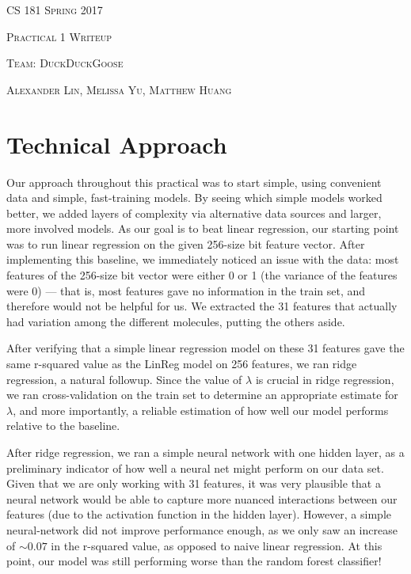 \documentclass[12pt]{article}
\begin{document}
\begin{center}
\textsc{CS 181 Spring 2017}

\textsc{Practical 1 Writeup}

\textsc{Team: DuckDuckGoose}

\textsc{Alexander Lin, Melissa Yu, Matthew Huang}
\end{center}

\section{Technical Approach}

Our approach throughout this practical was to start simple, using convenient data and simple, fast-training models. By seeing which simple models worked better, we added layers of complexity via alternative data sources and larger, more involved models. As our goal is to beat linear regression, our starting point was to run linear regression on the given 256-size bit feature vector. After implementing this baseline, we immediately noticed an issue with the data: most features of the 256-size bit vector were either 0 or 1 (the variance of the features were 0) --- that is, most features gave no information in the train set, and therefore would not be helpful for us. We extracted the 31 features that actually had variation among the different molecules, putting the others aside. 

After verifying that a simple linear regression model on these 31 features gave the same r-squared value as the LinReg model on 256 features, we ran ridge regression, a natural followup. Since the value of $\lambda$ is crucial in ridge regression, we ran cross-validation on the train set to determine an appropriate estimate for $\lambda$, and more importantly, a reliable estimation of how well our model performs relative to the baseline. 

After ridge regression, we ran a simple neural network with one hidden layer, as a preliminary indicator of how well a neural net might perform on our data set. Given that we are only working with 31 features, it was very plausible that a neural network would be able to capture more nuanced interactions between our features (due to the activation function in the hidden layer). However, a simple neural-network did not improve performance enough, as we only saw an increase of $\sim 0.07$ in the r-squared value, as opposed to naive linear regression. At this point, our model was still performing worse than the random forest classifier!
\end{document}
